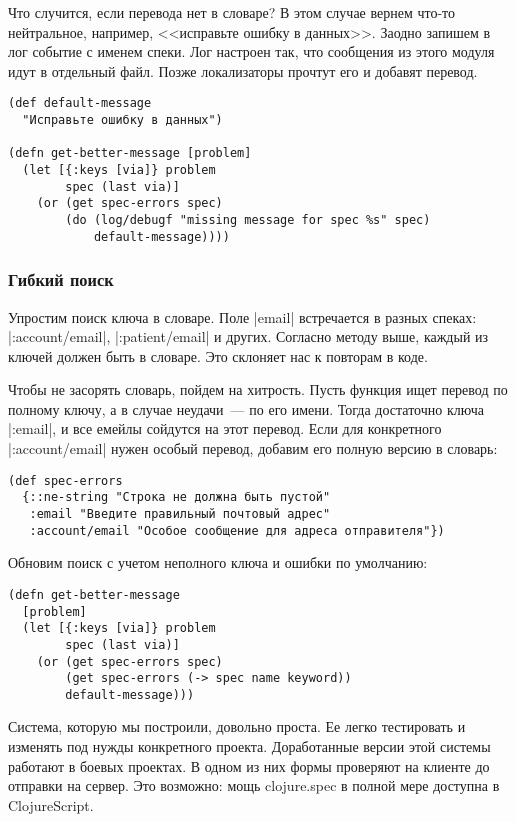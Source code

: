 Что случится, если перевода нет в словаре? В этом случае вернем что-то
нейтральное, например, <<исправьте ошибку в данных>>. Заодно запишем в лог
событие с именем спеки. Лог настроен так, что сообщения из этого модуля идут в
отдельный файл. Позже локализаторы прочтут его и добавят перевод.

\begin{verbatim}
(def default-message
  "Исправьте ошибку в данных")

(defn get-better-message [problem]
  (let [{:keys [via]} problem
        spec (last via)]
    (or (get spec-errors spec)
        (do (log/debugf "missing message for spec %s" spec)
            default-message))))
\end{verbatim}

\subsubsection{Гибкий поиск}

Упростим поиск ключа в словаре. Поле \spverb|email| встречается в разных спеках:
\spverb|:account/email|, \spverb|:patient/email| и других. Согласно методу выше,
каждый из ключей должен быть в словаре. Это склоняет нас к повторам в коде.

Чтобы не засорять словарь, пойдем на хитрость. Пусть функция ищет перевод по
полному ключу, а в случае неудачи~--- по его имени. Тогда достаточно ключа
\spverb|:email|, и все емейлы сойдутся на этот перевод. Если для конкретного
\spverb|:account/email| нужен особый перевод, добавим его полную версию в словарь:

\begin{verbatim}
(def spec-errors
  {::ne-string "Строка не должна быть пустой"
   :email "Введите правильный почтовый адрес"
   :account/email "Особое сообщение для адреса отправителя"})
\end{verbatim}

\noindent
Обновим поиск с учетом неполного ключа и ошибки по умолчанию:

\begin{verbatim}
(defn get-better-message
  [problem]
  (let [{:keys [via]} problem
        spec (last via)]
    (or (get spec-errors spec)
        (get spec-errors (-> spec name keyword))
        default-message)))
\end{verbatim}

Система, которую мы построили, довольно проста. Ее легко тестировать и изменять
под нужды конкретного проекта. Доработанные версии этой системы работают в
боевых проектах. В одном из них формы проверяют на клиенте до отправки на
сервер. Это возможно: мощь clojure.spec в полной мере доступна в ClojureScript.

